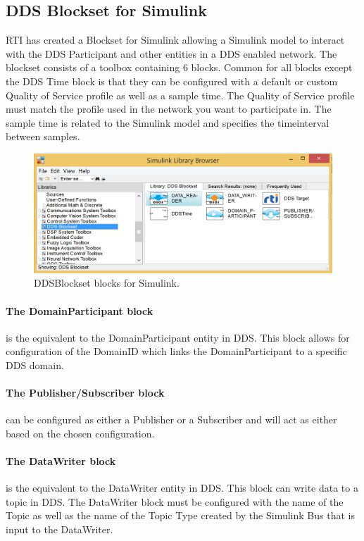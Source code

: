 \subsection{DDS Blockset for Simulink}
RTI has created a Blockset for Simulink allowing a Simulink model to interact with the DDS Participant and other entities in a DDS enabled network.
The blockset consists of a toolbox containing 6 blocks. Common for all blocks except the DDS Time block is that they can be configured with a default or custom Quality of Service profile as well as a sample time. The Quality of Service profile must match the profile used in the network you want to participate in. The sample time is related to the Simulink model and specifies the timeinterval between samples.

\begin{figure}[h]
\includegraphics[width=\textwidth]{figures/DDSBlockset}
	\caption[DDSBlockset blocks for Simulink]{
		\label{fig:DDSBlocksetBlocks} 
		\footnotesize{%
			DDSBlockset blocks for Simulink.
		}
	}
\end{figure}


\paragraph{The DomainParticipant block} is the equivalent to the DomainParticipant entity in DDS. This block allows for configuration of the DomainID which links the DomainParticipant to a specific DDS domain.

\paragraph{The Publisher/Subscriber block} can be configured as either a Publisher or a Subscriber and will act as either based on the chosen configuration.

\paragraph{The DataWriter block} is the equivalent to the DataWriter entity in DDS. This block can write data to a topic in DDS. The DataWriter block must be configured with the name of the Topic as well as the name of the Topic Type created by the Simulink Bus that is input to the DataWriter.

